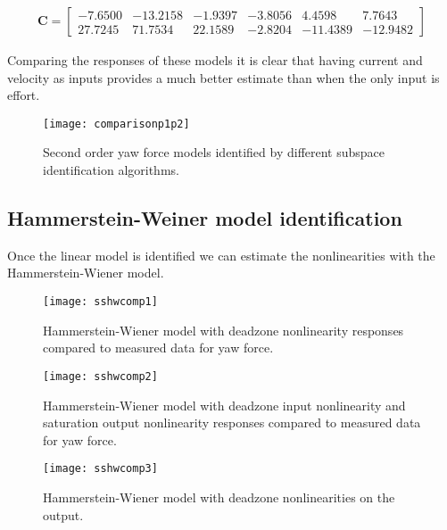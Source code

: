 \begin{align}
\mathbf{C} = \begin{bmatrix}
   -7.6500  &-13.2158   &-1.9397   &-3.8056    &4.4598    &7.7643\\
   27.7245   &71.7534   &22.1589   &-2.8204  &-11.4389  &-12.9482     
\end{bmatrix}
\end{align}

Comparing the responses of these models it is clear that having current and velocity as inputs provides a much better estimate than when the only input is effort.

\begin{figure}[H]
\centering
\hspace{-2em}\texttt{[image: comparisonp1p2]}
\caption{Second order yaw force models identified by different subspace identification algorithms.}
\label{fig:1LMI2}
\end{figure}
\subsection{Hammerstein-Weiner model identification}

Once the linear model is identified we can estimate the nonlinearities with the Hammerstein-Wiener model.

\begin{figure}[H]
\centering
\hspace{-2.5em}\texttt{[image: sshwcomp1]}
\caption{Hammerstein-Wiener model with deadzone nonlinearity responses compared to measured data for yaw force.}
\label{fig:2LMI}
\end{figure}

\begin{figure}[H]
\centering
\hspace{-2.5em}\texttt{[image: sshwcomp2]}
\caption{Hammerstein-Wiener model with deadzone input nonlinearity and saturation output nonlinearity responses compared to measured data for yaw force.}
\label{fig:2LMI1}
\end{figure}

\begin{figure}[H]
\centering
\hspace{-2.5em}\texttt{[image: sshwcomp3]}
\caption{Hammerstein-Wiener model with deadzone nonlinearities on the output.}
\label{fig:2LMI2}
\end{figure}

